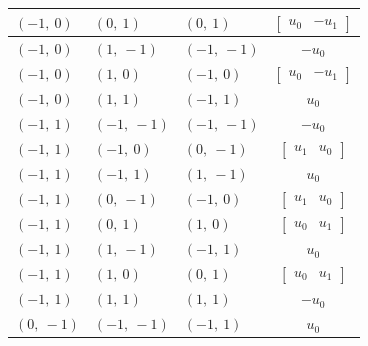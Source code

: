 \documentclass[11pt]{article}
\theoremstyle{definition}
\begin{document}
\begin{longtable}{|l|l|l|c|}
    \hline
    $\left( -1, \  0\right)$ & $\left( 0, \  1\right)$ & $\left( 0, \  1\right)$ & $\left[\begin{matrix}u_{0} & - u_{1}\end{matrix}\right]$ \\
    \hline
    $\left( -1, \  0\right)$ & $\left( 1, \  -1\right)$ & $\left( -1, \  -1\right)$ & $- u_{0}$ \\
    \hline
    $\left( -1, \  0\right)$ & $\left( 1, \  0\right)$ & $\left( -1, \  0\right)$ & $\left[\begin{matrix}u_{0} & - u_{1}\end{matrix}\right]$ \\
    \hline
    $\left( -1, \  0\right)$ & $\left( 1, \  1\right)$ & $\left( -1, \  1\right)$ & $u_{0}$ \\
    \hline
    $\left( -1, \  1\right)$ & $\left( -1, \  -1\right)$ & $\left( -1, \  -1\right)$ & $- u_{0}$ \\
    \hline
    $\left( -1, \  1\right)$ & $\left( -1, \  0\right)$ & $\left( 0, \  -1\right)$ & $\left[\begin{matrix}u_{1} & u_{0}\end{matrix}\right]$ \\
    \hline
    $\left( -1, \  1\right)$ & $\left( -1, \  1\right)$ & $\left( 1, \  -1\right)$ & $u_{0}$ \\
    \hline
    $\left( -1, \  1\right)$ & $\left( 0, \  -1\right)$ & $\left( -1, \  0\right)$ & $\left[\begin{matrix}u_{1} & u_{0}\end{matrix}\right]$ \\
    \hline
    $\left( -1, \  1\right)$ & $\left( 0, \  1\right)$ & $\left( 1, \  0\right)$ & $\left[\begin{matrix}u_{0} & u_{1}\end{matrix}\right]$ \\
    \hline
    $\left( -1, \  1\right)$ & $\left( 1, \  -1\right)$ & $\left( -1, \  1\right)$ & $u_{0}$ \\
    \hline
    $\left( -1, \  1\right)$ & $\left( 1, \  0\right)$ & $\left( 0, \  1\right)$ & $\left[\begin{matrix}u_{0} & u_{1}\end{matrix}\right]$ \\
    \hline
    $\left( -1, \  1\right)$ & $\left( 1, \  1\right)$ & $\left( 1, \  1\right)$ & $- u_{0}$ \\
    \hline
    $\left( 0, \  -1\right)$ & $\left( -1, \  -1\right)$ & $\left( -1, \  1\right)$ & $u_{0}$ \\

\end{longtable}
\end{document}
